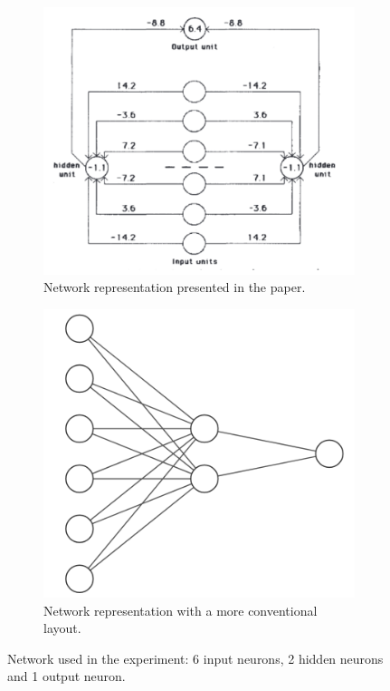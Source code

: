 \documentclass{article}
\begin{document}
    \begin{figure}
        \centering
        \begin{subfigure}[b]{0.45\textwidth}
            \centering
            \includegraphics[width=\textwidth]{images/img-01}
            \caption{Network representation presented in the paper.}
            \label{fig:1.A}
        \end{subfigure}
        \begin{subfigure}[b]{0.45\textwidth}
            \centering
            \includegraphics[width=\textwidth]{images/img-00}
            \caption{Network representation with a more conventional layout.}
            \label{fig:1.B}
        \end{subfigure}
        \caption{Network used in the experiment: 6 input neurons, 2 hidden neurons and 1 output neuron.}
        \label{fig:1}
    \end{figure}
\end{document}

